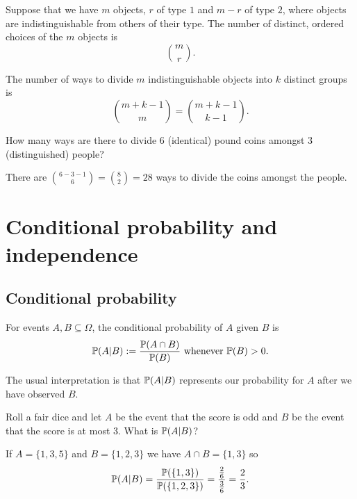 \documentclass[10pt, a4paper]{article}
\begin{document}
\begin{countprinc}
    Suppose that we have $m$ objects, $r$ of type $1$ and $m - r$ of type $2$, where objects are indistinguishable from others of their type. The number of distinct, ordered choices of the $m$ objects is
    \[
    \binom{m}{r}.
    \]
\end{countprinc}

\begin{countprinc}
    The number of ways to divide $m$ indistinguishable objects into $k$ distinct groups is
    \[
    \binom{m + k - 1}{m} = \binom{m + k - 1}{k - 1}.
    \]
\end{countprinc}

\begin{example}
    How many ways are there to divide $6$ (identical) pound coins amongst $3$ (distinguished) people?

    There are $\binom{6 - 3 - 1}{6} = \binom{8}{2} = 28$ ways to divide the coins amongst the people.
\end{example}

\section{Conditional probability and independence}

\subsection{Conditional probability}
\begin{definition}
    For events $A, B \subseteq \Omega$, the conditional probability of $A$ given $B$ is
    \[
    \P(A | B) := \frac{\P (A \cap B)}{\P (B)}\text{ whenever } \P(B) > 0.
    \]
\end{definition}
The usual interpretation is that $\P(A | B)$ represents our probability for $A$ after we have observed $B$.

\begin{example}
    Roll a fair dice and let $A$ be the event that the score is odd and $B$ be the event that the score is at most $3$. What is $\P (A | B)$?

    If $A = \{1, 3, 5\}$ and $B = \{1, 2, 3\}$ we have $A \cap B = \{1, 3\}$ so
    \[
    \P (A | B) = \frac{\P(\{1, 3\})}{\P(\{1, 2, 3\})} = \frac{\frac{2}{6}}{\frac{3}{6}} = \frac{2}{3}.
    \]
\end{example}
\end{document}
